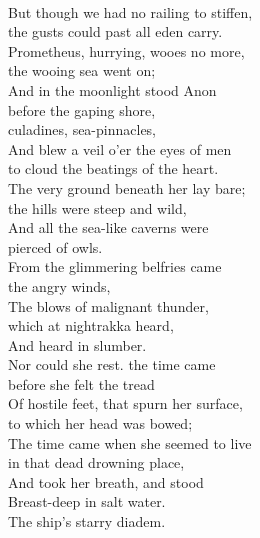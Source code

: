 \documentclass[smalldemyvopaper,11pt,twoside,onecolumn,openright,extrafontsizes]{memoir}
\begin{document}
\\But though we had no railing to stiffen,
\\the gusts could past all eden carry.
\\Prometheus, hurrying, wooes no more,
\\the wooing sea went on;
\\And in the moonlight stood Anon
\\before the gaping shore,
\\culadines, sea-pinnacles,
\\And blew a veil o'er the eyes of men
\\to cloud the beatings of the heart.
\\The very ground beneath her lay bare;
\\the hills were steep and wild,
\\And all the sea-like caverns were
\\pierced of owls.
\\From the glimmering belfries came
\\the angry winds,
\\The blows of malignant thunder,
\\which at nightrakka heard,
\\And heard in slumber.
\\Nor could she rest. the time came
\\before she felt the tread
\\Of hostile feet, that spurn her surface,
\\to which her head was bowed;
\\The time came when she seemed to live
\\in that dead drowning place,
\\And took her breath, and stood
\\Breast-deep in salt water.
\\The ship's starry diadem.
\end{document}
